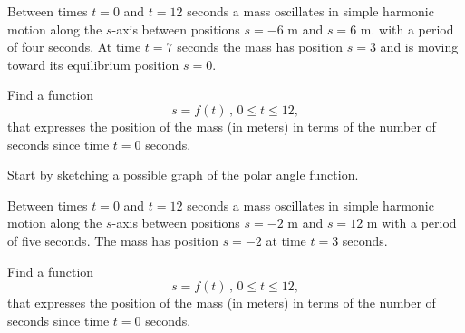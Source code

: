 \documentclass{ximera}
\begin{document}
\begin{example} \label{ExLKDr45533}
Between times $t=0$ and $t=12$ seconds a mass oscillates in simple harmonic motion along the $s$-axis between positions $s=-6$ m and $s=6$ m. with a period of four seconds. At time $t=7$ seconds the mass has position $s=3$ and is moving toward its equilibrium position $s=0$. 

Find a function
\[
     s = f(t) \, , \, 0\leq t \leq 12,
\]
that expresses the position of the mass (in meters) in terms of the number of seconds since time $t=0$ seconds.

Start by sketching a possible graph of the polar angle function.
\end{example}

\begin{example} \label{ExLKDrefr33}
Between times $t=0$ and $t=12$ seconds a mass oscillates in simple harmonic motion along the $s$-axis between positions $s=-2$ m and $s=12$ m with a period of five seconds. The mass has position $s=-2$ at time $t=3$ seconds. %

Find a function
\[
     s = f(t) \, , \, 0\leq t \leq 12,
\]
that expresses the position of the mass (in meters) in terms of the number of seconds since time $t=0$ seconds.
\end{example}
\end{document}
